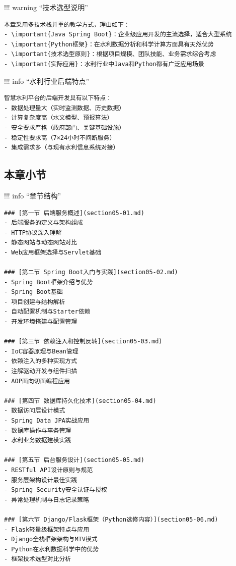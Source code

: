 !!! warning ``技术选型说明''

\begin{verbatim}
本章采用多技术栈并重的教学方式，理由如下：
- \important{Java Spring Boot}：企业级应用开发的主流选择，适合大型系统
- \important{Python框架}：在水利数据分析和科学计算方面具有天然优势
- \important{技术选型原则}：根据项目规模、团队技能、业务需求综合考虑
- \important{实际应用}：水利行业中Java和Python都有广泛应用场景
\end{verbatim}

!!! info ``水利行业后端特点''

\begin{verbatim}
智慧水利平台的后端开发具有以下特点：
- 数据处理量大（实时监测数据、历史数据）
- 计算复杂度高（水文模型、预报算法）
- 安全要求严格（政府部门、关键基础设施）
- 稳定性要求高（7×24小时不间断服务）
- 集成需求多（与现有水利信息系统对接）
\end{verbatim}

\hypertarget{ux672cux7ae0ux5c0fux8282}{%
\subsection{本章小节}\label{ux672cux7ae0ux5c0fux8282}}

!!! info ``章节结构''

\begin{verbatim}
### [第一节 后端服务概述](section05-01.md)
- 后端服务的定义与架构组成
- HTTP协议深入理解
- 静态网站与动态网站对比
- Web应用框架选择与Servlet基础

### [第二节 Spring Boot入门与实践](section05-02.md)
- Spring Boot框架介绍与优势
- Spring Boot基础
- 项目创建与结构解析
- 自动配置机制与Starter依赖
- 开发环境搭建与配置管理

### [第三节 依赖注入和控制反转](section05-03.md)
- IoC容器原理与Bean管理
- 依赖注入的多种实现方式
- 注解驱动开发与组件扫描
- AOP面向切面编程应用

### [第四节 数据库持久化技术](section05-04.md)
- 数据访问层设计模式
- Spring Data JPA实战应用
- 数据库操作与事务管理
- 水利业务数据建模实践

### [第五节 后台服务设计](section05-05.md)
- RESTful API设计原则与规范
- 服务层架构设计最佳实践
- Spring Security安全认证与授权
- 异常处理机制与日志记录策略

### [第六节 Django/Flask框架（Python选修内容）](section05-06.md)
- Flask轻量级框架特点与应用
- Django全栈框架架构与MTV模式
- Python在水利数据科学中的优势
- 框架技术选型对比分析
\end{verbatim}

